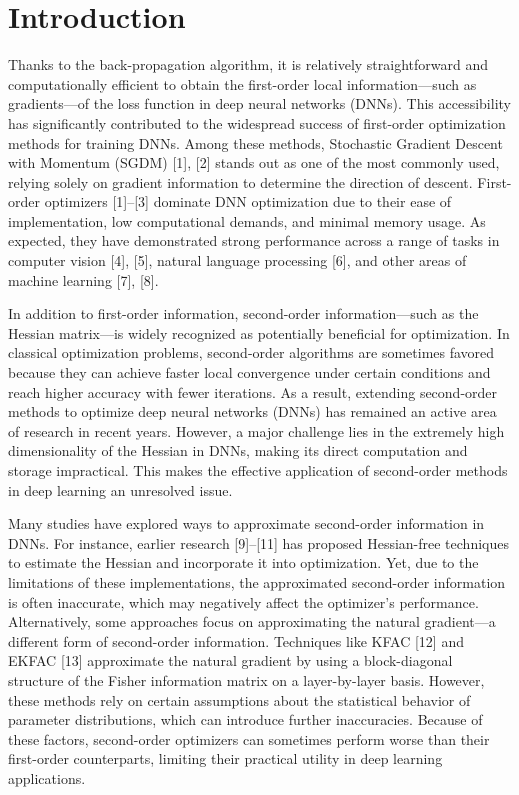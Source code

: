 \documentclass[conference]{IEEEtran}
\begin{document}


\section{Introduction}

Thanks to the back-propagation algorithm, it is relatively straightforward and computationally efficient to obtain the first-order local information—such as gradients—of the loss function in deep neural networks (DNNs). This accessibility has significantly contributed to the widespread success of first-order optimization methods for training DNNs. Among these methods, Stochastic Gradient Descent with Momentum (SGDM) [1], [2] stands out as one of the most commonly used, relying solely on gradient information to determine the direction of descent. First-order optimizers [1]–[3] dominate DNN optimization due to their ease of implementation, low computational demands, and minimal memory usage. As expected, they have demonstrated strong performance across a range of tasks in computer vision [4], [5], natural language processing [6], and other areas of machine learning [7], [8].

In addition to first-order information, second-order information—such as the Hessian matrix—is widely recognized as potentially beneficial for optimization. In classical optimization problems, second-order algorithms are sometimes favored because they can achieve faster local convergence under certain conditions and reach higher accuracy with fewer iterations. As a result, extending second-order methods to optimize deep neural networks (DNNs) has remained an active area of research in recent years. However, a major challenge lies in the extremely high dimensionality of the Hessian in DNNs, making its direct computation and storage impractical. This makes the effective application of second-order methods in deep learning an unresolved issue.

Many studies have explored ways to approximate second-order information in DNNs. For instance, earlier research [9]–[11] has proposed Hessian-free techniques to estimate the Hessian and incorporate it into optimization. Yet, due to the limitations of these implementations, the approximated second-order information is often inaccurate, which may negatively affect the optimizer’s performance. Alternatively, some approaches focus on approximating the natural gradient—a different form of second-order information. Techniques like KFAC [12] and EKFAC [13] approximate the natural gradient by using a block-diagonal structure of the Fisher information matrix on a layer-by-layer basis. However, these methods rely on certain assumptions about the statistical behavior of parameter distributions, which can introduce further inaccuracies. Because of these factors, second-order optimizers can sometimes perform worse than their first-order counterparts, limiting their practical utility in deep learning applications.
\end{document}
